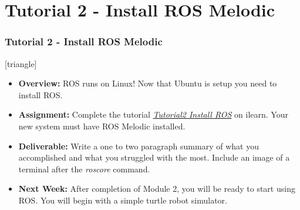 \documentclass[fleqn]{beamer} %
\newcommand{\sectiontitleV}{Tutorial 2 - Install ROS Melodic}
\begin{document}
\section{\sectiontitleV}	
	            \begin{frame}[label=sectionV] \small
		\frametitle{\sectiontitleV}    
	
 [triangle]
                \begin{itemize}

					\item {\bf Overview:} ROS runs on Linux! Now that Ubuntu is setup you need to install ROS. 		

					\item {\bf Assignment:} Complete the tutorial \href{https://github.com/thillRobot/ros_workshop/blob/noetic/module2/tutorial2_install_ros/tutorial2_install_ros.md}{\it Tutorial2 Install ROS} on ilearn. Your new system must have ROS Melodic installed.
                    
                    \item {\bf Deliverable:} Write a one to two paragraph summary of what you accomplished and what you struggled with the most. Include an image of a terminal after the {\it roscore} command. 
    
                    \item {\bf Next Week:} After completion of Module 2, you will be ready to start using ROS. You will begin with a simple turtle robot simulator. \vspc
                               
                \end{itemize}
		\end{frame}
\end{document}
